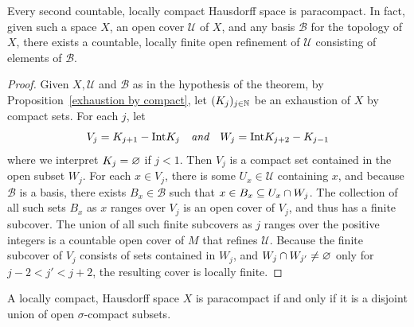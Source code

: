 \begin{theorem}\label{loc compact paracompact}
Every second countable, locally compact Hausdorff space is paracompact. In fact, given such a space $X$, an open cover $\mathcal{U}$ of $X$, and any basis $\mathcal{B}$ for the topology of $X$, there exists a countable, locally finite open refinement of $\mathcal{U}$ consisting of elements of $\mathcal{B}$.
\end{theorem}
\begin{proof}
Given $X,\mathcal{U}$ and $\mathcal{B}$ as in the hypothesis of the theorem, by Proposition~\ref{exhaustion by compact}, let $(K_j)_{j\in\mathbb{N}}$ be an exhaustion of $X$ by compact sets. For each $j$, let
\[V_j=K_{j+1}-\mathrm{Int} K_j\quad\textit{and}\quad W_j=\mathrm{Int} K_{j+2}-K_{j-1}\]
where we interpret $K_j=\varnothing$ if $j<1$. Then $V_j$ is a compact set contained in the open subset $W_j$. For each $x\in V_j$, there is some $U_x\in\mathcal{U}$ containing $x$, and because $\mathcal{B}$ is a basis, there exists $B_x\in\mathcal{B}$ such that $x\in B_x\subseteq U_x\cap W_j$. The collection of all such sets $B_x$ as $x$ ranges over $V_j$ is an open cover of $V_j$, and thus has a finite subcover. The union of all such finite subcovers as $j$ ranges over the positive integers is a countable open cover of $M$ that refines $\mathcal{U}$. Because the finite subcover of $V_j$ consists of sets contained in $W_j$, and $W_j\cap W_{j'}\neq \varnothing$ only for $j-2<j'<j+2$, the resulting cover is locally finite.
\end{proof}
\begin{theorem}\label{paracompact iff sigma-compact}
A locally compact, Hausdorff space $X$ is paracompact if and only if it is a disjoint union of open $\sigma$-compact subsets.
\end{theorem}
